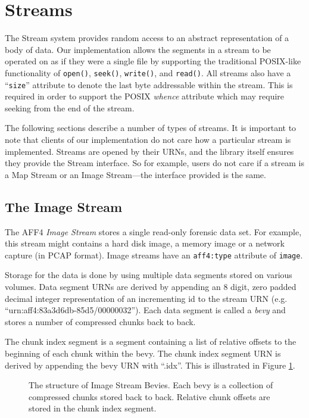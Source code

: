 \documentclass[10pt, conference]{IEEEtran}
\begin{document}
\section{Streams}
The Stream system provides random access to an abstract representation
of a body of data. Our implementation allows the segments in a stream
to be operated on as if they were a single file by supporting the
traditional POSIX-like functionality of
\texttt{open()}, \texttt{seek()}, \texttt{write()}, and
\texttt{read()}. All streams also have a ``\texttt{size}'' attribute
to denote the last byte addressable within the stream. This is
required in order to support the POSIX \emph{whence} attribute which
may require seeking from the end of the stream.

The following sections describe a number of types of streams. It is
important to note that clients of our implementation do not care how a
particular stream is implemented. Streams are opened by their URNs,
and the library itself ensures they provide the Stream interface. So
for example, users do not care if a stream is a Map Stream or an Image
Stream---the interface provided is the same.

\subsection{The Image Stream}
\label{image_stream}
The AFF4 \emph{Image Stream} stores a single read-only forensic data
set. For example, this stream might contains a hard disk image, a
memory image or a network capture (in PCAP format). Image streams have
an \texttt{aff4:type} attribute of \texttt{image}.

Storage for the data is done by using multiple data segments stored on
various volumes. Data segment URNs are derived by appending an 8
digit, zero padded decimal integer representation of an incrementing
id to the stream URN (e.g. ``urn:aff4:83a3d6db-85d5/00000032''). Each
data segment is called a \emph{bevy} and stores a number of compressed
chunks back to back.

The chunk index segment is a segment containing a list of relative
offsets to the beginning of each chunk within the bevy. The chunk
index segment URN is derived by appending the bevy URN with
``.idx''. This is illustrated in Figure \ref{image_stream_bevy}.

\begin{figure}[tb]
  \begin{center}
  \mbox{\columnwidth {}}
  \caption{The structure of Image Stream Bevies. Each bevy is a
collection of compressed chunks stored back to back. Relative chunk
offsets are stored in the chunk index segment.}
  \label{image_stream_bevy}
  \end{center}
\end{figure}
\end{document}
